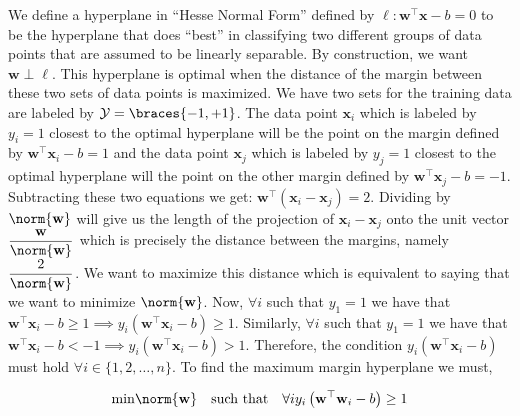 \documentclass[12pt]{article}
\begin{document}
\begin{enumerate}
\begin{tcolorbox}[colback=white, sharp corners]
We define a hyperplane in ``Hesse Normal Form'' defined by $\ell:  \mathbf{w}^\top \mathbf{x} - b = 0$ to be the hyperplane that does ``best'' in classifying two different groups of data points that are assumed to be linearly separable. By construction, we want $\mathbf{w} \perp \ell$.  This hyperplane is optimal when the distance of the margin between these two sets of data points is maximized. We have two sets for the training data are labeled by $\mathcal{Y} = \braces{-1, +1}$. The data point $\mathbf{x}_i$ which is labeled by $y_i = 1$ closest to the optimal hyperplane will be the point on the margin defined by $\mathbf{w}^\top \mathbf{x}_i - b = 1$ and the data point $\mathbf{x}_j$ which is labeled by $y_j = 1$ closest to the optimal hyperplane will the point on the other margin defined by $\mathbf{w}^\top \mathbf{x}_j - b = -1$. Subtracting these two equations we get: $\mathbf{w}^\top(\mathbf{x}_i - \mathbf{x}_j) = 2$. Dividing by $\norm{\mathbf{w}}$ will give us the length of the projection of $\mathbf{x}_i - \mathbf{x}_j$ onto the unit vector $\dfrac{\mathbf{w}}{\norm{\mathbf{w}}}$ which is precisely the distance between the margins, namely $\dfrac{2}{\norm{\mathbf{w}}}$. We want to maximize this distance which is equivalent to saying that we want to minimize $\norm{\mathbf{w}}$. Now, $\forall i$ such that $y_1 = 1$ we have that $\mathbf{w}^\top \mathbf{x}_i - b \geq 1 \implies y_i \left( \mathbf{w}^\top \mathbf{x}_i - b  \right) \geq 1$. Similarly, $\forall i$ such that $y_1 = 1$ we have that $\mathbf{w}^\top \mathbf{x}_i - b < -1 \implies y_i \left( \mathbf{w}^\top \mathbf{x}_i - b  \right) > 1$. Therefore, the condition $y_i \left( \mathbf{w}^\top \mathbf{x}_i - b  \right)$ must hold $\forall i \in \lbrace 1, 2, \ldots, n \rbrace$. To find the maximum margin hyperplane we must, 

\[
	\mathrm{min} \norm{\mathbf{w}} \quad \text{such that} \quad \forall i y_i\left(\mathbf{w}^\top \mathbf{w}_i - b\right) \geq1
	\]
\end{tcolorbox}

\newpage


\begin{tcolorbox}[colback=white, sharp corners]


\end{tcolorbox}
\end{enumerate}
\end{document}
